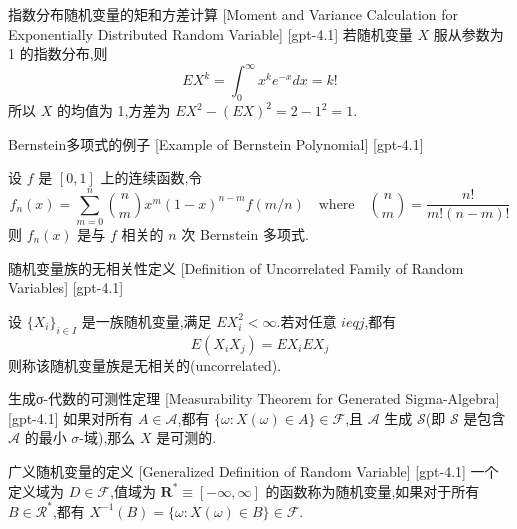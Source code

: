 \documentclass[UTF8]{ctexart}
\begin{document}
    
    
    \begin{xmp}
        {指数分布随机变量的矩和方差计算}
        [Moment and Variance Calculation for Exponentially Distributed Random Variable]
        [gpt-4.1]
        若随机变量 $X$ 服从参数为 1 的指数分布,则
\[
E X^{k} = \int_{0}^{\infty} x^{k} e^{-x} dx = k!
\]
所以 $X$ 的均值为 1,方差为 $E X^{2} - (E X)^{2} = 2 - 1^{2} = 1$.
    \end{xmp}
    
    
    
    \begin{xmp}
        {Bernstein多项式的例子}
        [Example of Bernstein Polynomial]
        [gpt-4.1]
        
设 $f$ 是 $[0,1]$ 上的连续函数,令
\[
f_n(x) = \sum_{m=0}^n \binom{n}{m} x^m (1-x)^{n-m} f(m/n) \quad \text{where} \quad \binom{n}{m} = \frac{n!}{m!(n-m)!}
\]
则 $f_n(x)$ 是与 $f$ 相关的 $n$ 次 Bernstein 多项式.

    \end{xmp}
    
    
    
    \begin{dfn}
        {随机变量族的无相关性定义}
        [Definition of Uncorrelated Family of Random Variables]
        [gpt-4.1]
        
设 $\{X_i\}_{i \in I}$ 是一族随机变量,满足 $E X_i^2 < \infty$.若对任意 $i 
eq j$,都有
\[
E(X_i X_j) = E X_i E X_j
\]
则称该随机变量族是无相关的(uncorrelated).

    \end{dfn}
    
    
    
    \begin{thm}
        {生成σ-代数的可测性定理}
        [Measurability Theorem for Generated Sigma-Algebra]
        [gpt-4.1]
        如果对所有 $A \in \mathcal{A}$,都有 $\{ \omega : X(\omega) \in A \} \in \mathcal{F}$,且 $\mathcal{A}$ 生成 $\mathcal{S}$(即 $\mathcal{S}$ 是包含 $\mathcal{A}$ 的最小 $\sigma$-域),那么 $X$ 是可测的.
    \end{thm}
    
    
    
    \begin{dfn}
        {广义随机变量的定义}
        [Generalized Definition of Random Variable]
        [gpt-4.1]
        一个定义域为 $D \in \mathcal{F}$,值域为 $\mathbf{R}^{*} \equiv [ -\infty, \infty ]$ 的函数称为随机变量,如果对于所有 $B \in \mathcal{R}^{*}$,都有 $X^{-1}(B) = \{ \omega : X(\omega) \in B \} \in \mathcal{F}$.
    \end{dfn}
    
\end{document}
